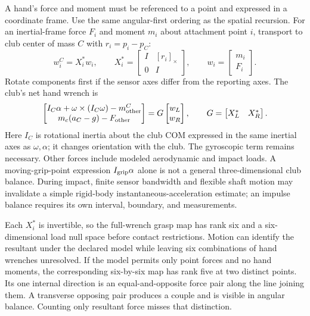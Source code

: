 A hand's force and moment must be referenced to a point and expressed in a
coordinate frame. Use the same angular-first ordering as the spatial recursion.
For an inertial-frame force $F_i$ and moment $m_i$ about attachment point $i$,
transport to club center of mass $C$ with $r_i=p_i-p_C$:
\begin{equation}
 w_i^C=X_i^*w_i,
 \qquad X_i^*=
 \begin{bmatrix}I&[r_i]_\times\\0&I\end{bmatrix},
 \qquad w_i=\begin{bmatrix}m_i\\F_i\end{bmatrix}.
 \label{eq:hand_wrench_transport}
\end{equation}
Rotate components first if the sensor axes differ from the reporting axes.
The club's net hand wrench is
\begin{equation}
 \begin{bmatrix}
 I_C\alpha+\omega\times(I_C\omega)-m_{\rm other}^C\\
 m_c(a_C-g)-F_{\rm other}
 \end{bmatrix}
 =G\begin{bmatrix}w_L\\w_R\end{bmatrix},
 \qquad G=\begin{bmatrix}X_L^*&X_R^*\end{bmatrix}.
 \label{eq:club_inverse_wrench}
\end{equation}
Here $I_C$ is rotational inertia about the club COM expressed in the same
inertial axes as $\omega,\alpha$; it changes orientation with the club.
The gyroscopic term remains necessary. Other forces include modeled aerodynamic
and impact loads. A moving-grip-point expression $I_{\rm grip}\alpha$ alone
is not a general three-dimensional club balance. During impact, finite sensor
bandwidth and flexible shaft motion may invalidate a simple rigid-body
instantaneous-acceleration estimate; an impulse balance requires its own
interval, boundary, and measurements.

Each $X_i^*$ is invertible, so the full-wrench grasp map has rank six and a
six-dimensional load null space before contact restrictions. Motion can identify
the resultant under the declared model while leaving six combinations of hand
wrenches unresolved. If the model permits only point forces and no hand moments,
the corresponding six-by-six map has rank five at two distinct points. Its one
internal direction is an equal-and-opposite force pair along the line joining
them. A transverse opposing pair produces a couple and is visible in angular
balance. Counting only resultant force misses that distinction.

